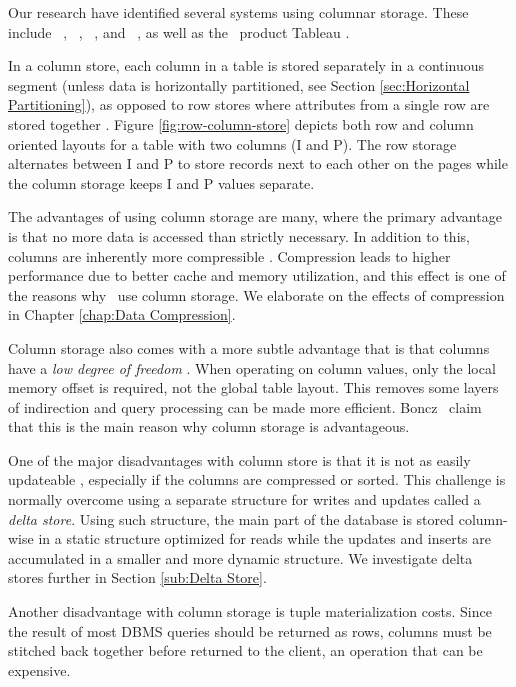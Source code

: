 Our research have identified several systems using columnar storage. These include \monetdb~\cite{Boncz2002-yj, Boncz2005-wj}, \cstore~\cite{Stonebraker2005-qz}, \saph~\cite{Farber2012-vh}, and \mssql~\cite{noauthor_undated-vq, Larson2013-mc}, as well as the \bd~product Tableau \cite{Kamkolkar2015-iq}.

In a column store, each column in a table is stored separately in a continuous segment (unless data is horizontally partitioned, see Section \ref{sec:Horizontal Partitioning}), as opposed to row stores where attributes from a single row are stored together \cite{Bjorklund2011-wh}. Figure \ref{fig:row-column-store} depicts both row and column oriented layouts for a table with two columns (I and P). The row storage alternates between I and P to store records next to each other on the pages while the column storage keeps I and P values separate. 

The advantages of using column storage are many, where the primary advantage is that no more data is accessed than strictly necessary. In addition to this, columns are inherently more compressible \cite{noauthor_undated-vq}. Compression leads to higher performance due to better cache and memory utilization, and this effect is one of the reasons why \mssql~use column storage. We elaborate on the effects of compression in Chapter \ref{chap:Data Compression}.

Column storage also comes with a more subtle advantage that is that columns have a \textit{low degree of freedom} \cite{Boncz2005-wj}. When operating on column values, only the local memory offset is required, not the global table layout. This removes some layers of indirection and query processing can be made more efficient. Boncz \ea~claim that this is the main reason why column storage is advantageous.


One of the major disadvantages with column store is that it is not as easily updateable \cite{Bjorklund2011-wh}, especially if the columns are compressed or sorted. This challenge is normally overcome using a separate structure for writes and updates called a \textit{delta store}. Using such structure, the main part of the database is stored column-wise in a static structure optimized for reads while the updates and inserts are accumulated in a smaller and more dynamic structure. We investigate delta stores further in Section \ref{sub:Delta Store}.

Another disadvantage with column storage is tuple materialization costs. Since the result of most DBMS queries should be returned as rows, columns must be stitched back together before returned to the client, an operation that can be expensive.



